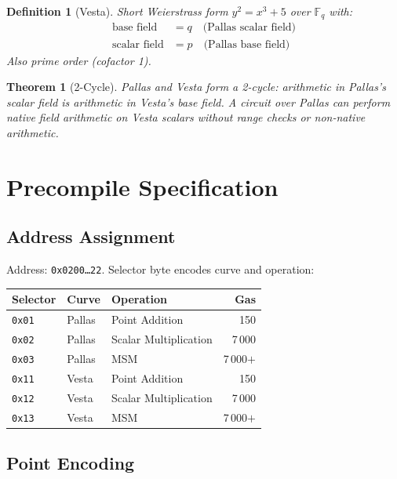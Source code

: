\documentclass[11pt,a4paper]{article}
\newtheorem{theorem}{Theorem}
\newtheorem{definition}{Definition}
\begin{document}
\begin{definition}[Vesta]
Short Weierstrass form $y^2 = x^3 + 5$ over $\mathbb{F}_q$ with:
\begin{align}
  \text{base field} &= q \quad \text{(Pallas scalar field)} \\
  \text{scalar field} &= p \quad \text{(Pallas base field)}
\end{align}
Also prime order (cofactor 1).
\end{definition}

\begin{theorem}[2-Cycle]
Pallas and Vesta form a 2-cycle: arithmetic in Pallas's scalar field is
arithmetic in Vesta's base field. A circuit over Pallas can perform native
field arithmetic on Vesta scalars without range checks or non-native arithmetic.
\end{theorem}

\section{Precompile Specification}

\subsection{Address Assignment}

Address: \texttt{0x0200\ldots22}. Selector byte encodes curve and operation:

\begin{table}[H]
\centering
\begin{tabular}{lllr}
\toprule
\textbf{Selector} & \textbf{Curve} & \textbf{Operation} & \textbf{Gas} \\
\midrule
\texttt{0x01} & Pallas & Point Addition & 150 \\
\texttt{0x02} & Pallas & Scalar Multiplication & 7\,000 \\
\texttt{0x03} & Pallas & MSM & 7\,000$+$ \\
\texttt{0x11} & Vesta & Point Addition & 150 \\
\texttt{0x12} & Vesta & Scalar Multiplication & 7\,000 \\
\texttt{0x13} & Vesta & MSM & 7\,000$+$ \\
\bottomrule
\end{tabular}
\end{table}

\subsection{Point Encoding}
\end{document}
